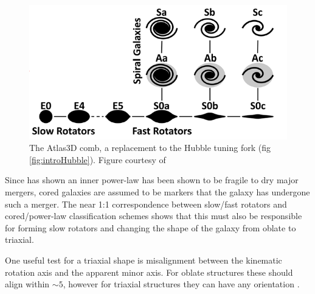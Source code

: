 {{	\begin{figure}
		\centering
		\includegraphics[width=\textwidth]{introduction/Atlas3D_comb.png}
		\caption[The Atlas3D comb]{The Atlas3D comb, a replacement to the Hubble tuning fork (fig \ref{fig:introHubble}). Figure courtesy of \citet{Cappellari2011a}}
		\label{fig:introAtlas3Dcomb}
	\end{figure}

	Since \citet{Sarzi2015} has shown an inner power-law has been shown to be fragile to dry major mergers, cored galaxies are assumed to be markers that the galaxy has undergone such a merger. The near 1:1 correspondence between slow/fast rotators and cored/power-law classification schemes shows that this must also be responsible for forming slow rotators and changing the shape of the galaxy from oblate to triaxial.

	One useful test for a triaxial shape is misalignment between the kinematic rotation axis and the apparent minor axis. For oblate structures these should align within $\sim 5$\textdegree, however for triaxial structures they can have any orientation \citep{Contopoulos1956, Stark1977, Statler1987}. 

}}
